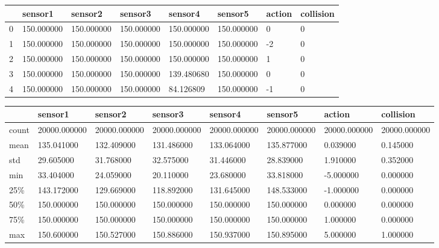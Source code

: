 \bigskip

\bigskip\noindent
\begin{tabular}{p{}p{}p{}p{}p{}p{}p{}p{}}
\toprule
~ & sensor1 & sensor2 & sensor3 & sensor4 & sensor5 & action & collision \\
\hline
0 & 150.000000 & 150.000000 & 150.000000 & 150.000000 & 150.000000 & 0 & 0 \\
\hline
1 & 150.000000 & 150.000000 & 150.000000 & 150.000000 & 150.000000 & -2 & 0 \\
\hline
2 & 150.000000 & 150.000000 & 150.000000 & 150.000000 & 150.000000 & 1 & 0 \\
\hline
3 & 150.000000 & 150.000000 & 150.000000 & 139.480680 & 150.000000 & 0 & 0 \\
\hline
4 & 150.000000 & 150.000000 & 150.000000 & 84.126809 & 150.000000 & -1 & 0 \\
\hline
\bottomrule
\end{tabular}

\bigskip

\bigskip\noindent
\begin{tabular}{p{}p{}p{}p{}p{}p{}p{}p{}}
\toprule
~ & sensor1 & sensor2 & sensor3 & sensor4 & sensor5 & action & collision \\
\hline
count & 20000.000000 & 20000.000000 & 20000.000000 & 20000.000000 & 20000.000000 & 20000.000000 & 20000.000000 \\
\hline
mean & 135.041000 & 132.409000 & 131.486000 & 133.064000 & 135.877000 & 0.039000 & 0.145000 \\
\hline
std & 29.605000 & 31.768000 & 32.575000 & 31.446000 & 28.839000 & 1.910000 & 0.352000 \\
\hline
min & 33.404000 & 24.059000 & 20.110000 & 23.680000 & 33.818000 & -5.000000 & 0.000000 \\
\hline
25\% & 143.172000 & 129.669000 & 118.892000 & 131.645000 & 148.533000 & -1.000000 & 0.000000 \\
\hline
50\% & 150.000000 & 150.000000 & 150.000000 & 150.000000 & 150.000000 & 0.000000 & 0.000000 \\
\hline
75\% & 150.000000 & 150.000000 & 150.000000 & 150.000000 & 150.000000 & 1.000000 & 0.000000 \\
\hline
max & 150.600000 & 150.527000 & 150.886000 & 150.937000 & 150.895000 & 5.000000 & 1.000000 \\
\hline
\bottomrule
\end{tabular}

